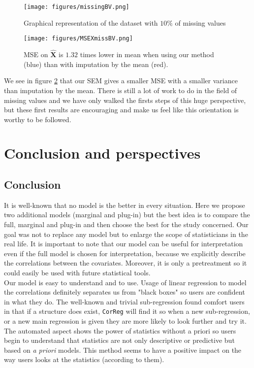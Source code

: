 \documentclass[12pt,a4paper]{report}
\begin{document}
	\begin{figure}[h!]
		\centering
		\texttt{[image: figures/missingBV.png]} 
		\caption{Graphical representation of the dataset with $10\%$ of missing values}\label{missingBV}
	\end{figure}
	\begin{figure}[h!]
		\centering
		\texttt{[image: figures/MSEXmissBV.png]} 
		\caption{MSE on $\hat{\boldsymbol{X}}$ is $1.32$ times lower in mean when using our method (blue) than with imputation by the mean (red).}\label{MSEXmissBV}
	\end{figure}
	We see in figure \ref{MSEXmissBV} that our SEM gives a smaller MSE with a smaller variance than imputation by the mean. There is still a lot of work to do in the field of missing values and we have only walked the firsts steps of this huge perspective, but these first results are encouraging and make us feel like this orientation is worthy to be followed.


\chapter{Conclusion and perspectives}
	\section{Conclusion}
		It is well-known that no model is the better in every situation. Here we propose two additional models (marginal and plug-in) but the best idea is to compare the full, marginal and plug-in and then choose the best for the study concerned. Our goal was not to replace any model but to enlarge the scope of statisticians in the real life. It is important to note that our model can be useful for interpretation even if the full model is chosen for interpretation, because we explicitly describe the correlations between the covariates. Moreover, it is only a pretreatment so it could easily be used with future statistical tools. \\
		
		Our model is easy to understand and to use. Usage of linear regression to model the correlations definitely separates us from "black boxes" so users are confident in what they do. The well-known and trivial sub-regression found comfort users in that if a structure does exist, {\tt CorReg} will find it so when a new sub-regression, or a new main regression is given they are more likely to look further and try it. The automated aspect shows the power of statistics without a priori so users begin to understand that statistics are not only descriptive or predictive but based on {\it a priori} models. This method seems to have a positive impact on the way users looks at the statistics (according to them). \\
		
\end{document}
